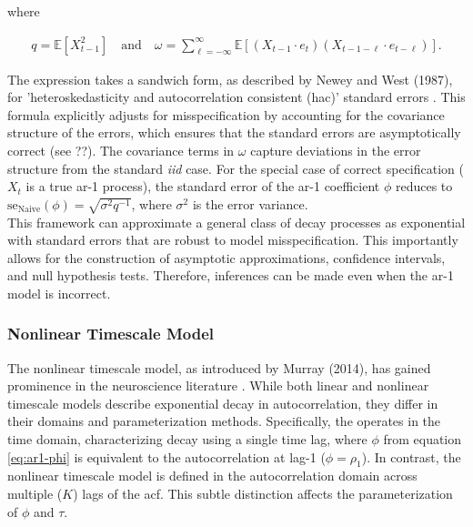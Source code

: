 \documentclass[main.tex]{subfiles}
\begin{document}
where

\begin{align*}
    q = \mathbb{E}[X_{t-1}^2] \quad\text{and}\quad \omega = \sum_{\ell=-\infty}^{\infty} \mathbb{E}[(X_{t-1} \cdot e_t)(X_{t-1-\ell} \cdot e_{t-\ell})].
\end{align*}

The expression takes a sandwich form, as described by Newey and West (1987), for 'heteroskedasticity and autocorrelation consistent (hac)' standard errors \cite{newey_simple_1987}. This formula explicitly adjusts for misspecification by accounting for the covariance structure of the errors, which ensures that the standard errors are asymptotically correct (see ??). The covariance terms in $\omega$ capture deviations in the error structure from the standard \textit{iid} case. For the special case of correct specification ($X_t$ is a true ar-1 process), the standard error of the ar-1 coefficient $\phi$ reduces to $\text{se}_{\text{Naive}}(\phi) = \sqrt{\sigma^2 q^{-1}}$, where $\sigma^2$ is the error variance. \\

This framework can approximate a general class of decay processes as exponential with standard errors that are robust to model misspecification. This importantly allows for the construction of asymptotic approximations, confidence intervals, and null hypothesis tests. Therefore, inferences can be made even when the ar-1 model is incorrect.

\subsubsection{Nonlinear Timescale Model}\label{sec:nonlinear-timescale-model}

The nonlinear timescale model, as introduced by Murray (2014), has gained prominence in the neuroscience literature \cite{murray_hierarchy_2014, rossi-pool_invariant_2021, cirillo_neural_2018, ito_cortical_2020, runyan_distinct_2017, zeraati_flexible_2022, nougaret_intrinsic_2021, wasmuht_intrinsic_2018, muller_core_2020, maisson_choice-relevant_2021, li_hierarchical_2022, shafiei_topographic_2020}. While both linear and nonlinear timescale models describe exponential decay in autocorrelation, they differ in their domains and parameterization methods. Specifically, the  operates in the time domain, characterizing decay using a single time lag, where $\phi$ from equation \eqref{eq:ar1-phi} is equivalent to the autocorrelation at lag-1 ($\phi = \rho_1$). In contrast, the nonlinear timescale model is defined in the autocorrelation domain across multiple ($K$) lags of the acf. This subtle distinction affects the parameterization of $\phi$ and $\tau$.\\
\end{document}

